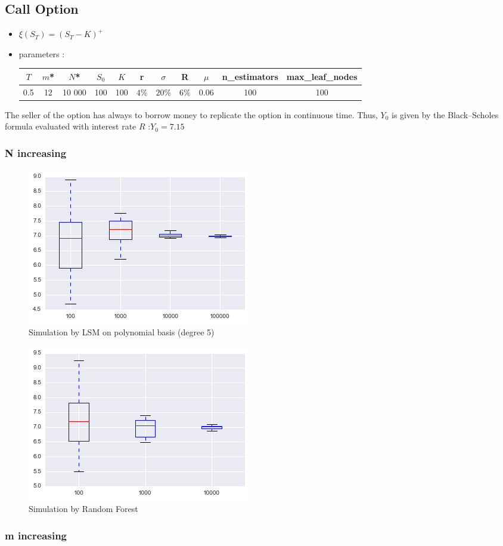 \documentclass[english,a4paper,12pt,titlepage]{book}
\begin{document}
\newpage

\subsection{Call Option}


\begin{itemize}
	\item $\xi(S_T)=(S_T-K)^+$
	\item parameters : 
	
	\begin{tabular}{c|c|c|c|c|c|c|c|c|c|c}
		$T$ & $m$* & $N$* & $S_0$  & $K$ & r& $\sigma$ & R & $\mu$ & n\_estimators & max\_leaf\_nodes\\
		\hline
		0.5  & 12 & 10 000 & 100  & 100 & $4\%$ & $20\% $ & $6\%$ & 0.06 & 100 & 100
	\end{tabular}
\end{itemize}

The seller of the option has always to borrow money to replicate the option in continuous time. Thus, $Y_0$ is given
by the Black–Scholes formula evaluated with interest rate $R$ :$Y_0 = 7.15$


\subsubsection{N increasing}



\begin{figure}[!htb]
	\centering
	\includegraphics[scale=0.65]{2rates_LSM_N_increasing.png}
	\caption{Simulation by LSM on polynomial basis (degree 5)}
\end{figure}


\begin{figure}[!htb]
	\centering
	\includegraphics[scale=0.65]{2rates_Rforest_N_increasing.png}
	\caption{Simulation by Random Forest}
\end{figure}

\subsubsection{m increasing}
	
\end{document}
